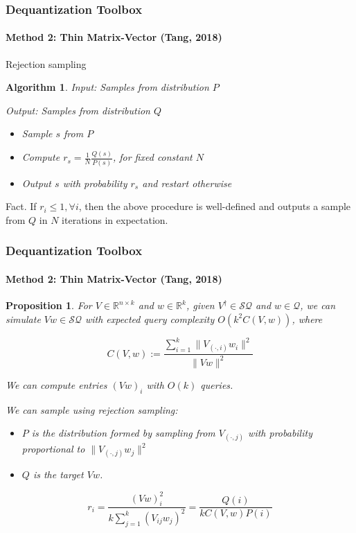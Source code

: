 \documentclass{beamer}
\newcommand\0{\mathbf{0}}
\newcommand\RR{\mathbb{R}}
\newcommand\<{\langle}
\renewcommand\>{\rangle}
\newtheorem{proposition}{Proposition}[theorem]
\newtheorem{algorithm}{Algorithm}[theorem]
\begin{document}
\begin{frame}
\frametitle{Dequantization Toolbox}
\framesubtitle{Method 2: Thin Matrix-Vector (Tang, 2018)}
\begin{definition}
Rejection sampling
\end{definition}
\begin{algorithm}
Input: Samples from distribution $P$

Output: Samples from distribution $Q$
\begin{itemize}
\item Sample $s$ from $P$
\item Compute $r_s = \frac{1}{N}\frac{Q(s)}{P(s)}$, for fixed constant $N$
\item Output $s$ with probability $r_s$ and restart otherwise
\end{itemize}
\end{algorithm}

\begin{fact}
Fact. If $r_i \leq 1, \forall i$, then the above procedure is well-defined and outputs a sample from $Q$ in $N$ iterations in expectation.	
\end{fact}


\end{frame}

\begin{frame}
\frametitle{Dequantization Toolbox}
\framesubtitle{Method 2: Thin Matrix-Vector (Tang, 2018)}
\begin{proposition}
	 For $V \in \RR^{n\times k}$ and $w \in \RR^k$, given $V^\dag \in \mathcal{SQ}$ and $w \in \mathcal{Q}$, we can simulate $Vw \in \mathcal{SQ}$ with expected query complexity $O(k^2C(V,w))$, where

$$C(V,w) := \frac{\sum_{i=1}^k\|V_{(\cdot, i)}w_i\|^2}{\|Vw\|^2}$$

We can compute entries $(Vw)_i$ with $O(k)$ queries.

We can sample using rejection sampling:

\begin{itemize}
\item $P$ is the distribution formed by sampling from $V_{(\cdot, j)}$ with probability proportional to $\|V_{(\cdot, j)}w_j\|^2$
  
\item $Q$ is the target $Vw$.
\end{itemize}

$$r_i = \frac{(Vw)_i^2}{k \sum_{j=1}^k (V_{ij}w_j)^2} = \frac{Q(i)}{kC(V,w)P(i)}$$
\end{proposition}
\end{frame}
\end{document}
